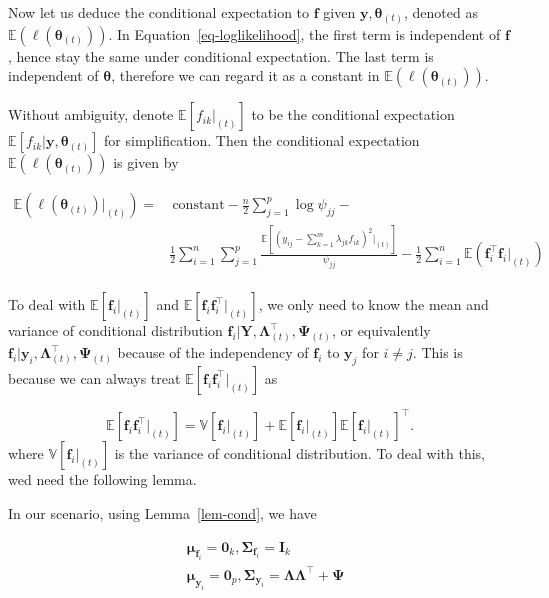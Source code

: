 \documentclass[
  a4paper,
  oneside,
  openany,
  12pt,
  onecolumn,
  twoside]{book}
\theoremstyle{plain}
\theoremstyle{remark}
\begin{document}
Now let us deduce the conditional expectation to \(\boldsymbol{f}\)
given \(\boldsymbol{y},\boldsymbol{\theta}_{(t)}\), denoted as
\(\mathbb{E}\left(\ell(\boldsymbol{\theta}_{(t)})\right)\). In
Equation~\ref{eq-loglikelihood}, the first term is independent of
\(\boldsymbol{f}\), hence stay the same under conditional expectation.
The last term is independent of \(\boldsymbol{\theta}\), therefore we
can regard it as a constant in
\(\mathbb{E}\left(\ell(\boldsymbol{\theta}_{(t)})\right)\).

Without ambiguity, denote \(\mathbb{E}[f_{ik}|_{(t)}]\) to be the
conditional expectation
\(\mathbb{E}[f_{ik}|\boldsymbol{y},\boldsymbol{\theta}_{(t)}]\) for
simplification. Then the conditional expectation
\(\mathbb{E}\left(\ell(\boldsymbol{\theta}_{(t)})\right)\) is given by

\[
\begin{align*}
\mathbb{E}\left(\ell(\boldsymbol{\theta}_{(t)})|_{(t)}\right)=& \ \text{constant}-\frac{n}{2}\sum_{j=1}^p\log{\psi_{jj}}-\\
&\frac{1}{2}\sum_{i=1}^n\sum_{j=1}^p \frac{\mathbb{E}\left[(y_{ij} - \sum_{k=1}^m \lambda_{jk}f_{ik})^2|_{(t)}\right]}{\psi_{jj}} - \frac{1}{2}\sum_{i=1}^n\mathbb{E}(\boldsymbol{f}_i^\top\boldsymbol{f}_i|_{(t)})\\
\end{align*}
\]

To deal with \(\mathbb{E}[\boldsymbol{f}_i|_{(t)}]\) and
\(\mathbb{E}[\boldsymbol{f}_i\boldsymbol{f}_i^\top|_{(t)}]\), we only
need to know the mean and variance of conditional distribution
\(\boldsymbol{f}_i|\boldsymbol{Y},\boldsymbol{\Lambda}^\top_{(t)},\boldsymbol{\Psi}_{(t)}\),
or equivalently
\(\boldsymbol{f}_i|\boldsymbol{y}_i,\boldsymbol{\Lambda}^\top_{(t)},\boldsymbol{\Psi}_{(t)}\)
because of the independency of \(\boldsymbol{f}_i\) to
\(\boldsymbol{y}_j\) for \(i\neq j\). This is because we can always
treat \(\mathbb{E}[\boldsymbol{f}_i\boldsymbol{f}_i^\top|_{(t)}]\) as

\[
\mathbb{E}[\boldsymbol{f}_i\boldsymbol{f}_i^\top|_{(t)}]= \mathbb{V}[\boldsymbol{f}_i|_{(t)}]+ \mathbb{E}[\boldsymbol{f}_i|_{(t)}]\mathbb{E}[\boldsymbol{f}_i|_{(t)}]^\top.
\] where \(\mathbb{V}[\boldsymbol{f}_i|_{(t)}]\) is the variance of
conditional distribution. To deal with this, wed need the following
lemma.

In our scenario, using Lemma~\ref{lem-cond}, we have

\[
\begin{align*}
& \boldsymbol{\mu}_{\boldsymbol{f}_i}= \boldsymbol{0}_k, \boldsymbol{\Sigma}_{\boldsymbol{f}_{i}}=\boldsymbol{I}_k\\
& \boldsymbol{\mu}_{\boldsymbol{y}_i}= \boldsymbol{0}_p, \boldsymbol{\Sigma}_{\boldsymbol{y}_i}=\boldsymbol{\Lambda}\boldsymbol{\Lambda}^\top+\boldsymbol{\Psi}
\end{align*} 
\]
\end{document}
